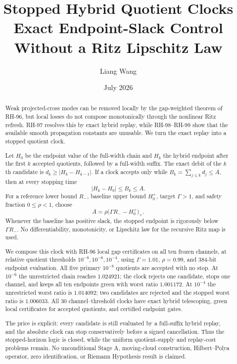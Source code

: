 \documentclass[11pt]{article}
\title{Stopped Hybrid Quotient Clocks\\
\large Exact Endpoint-Slack Control Without a Ritz Lipschitz Law}
\author{Liang Wang}
\date{July 2026}
\theoremstyle{definition}
\theoremstyle{remark}
\begin{document}
\maketitle

\begin{abstract}
Weak projected-cross modes can be removed locally by the gap-weighted theorem
of RH-96, but local losses do not compose monotonically through the nonlinear
Ritz refresh.  RH-97 resolves this by exact hybrid replay, while RH-98--RH-99
show that the available smooth propagation constants are unusable.  We turn
the exact replay into a stopped quotient clock.

Let $H_0$ be the endpoint value of the full-width chain and $H_k$ the hybrid
endpoint after the first $k$ accepted quotients, followed by a full-width
suffix.  The exact debit of the $k$th candidate is
$d_k\ge |H_k-H_{k-1}|$.  If a clock accepts only while
$B_k=\sum_{j\le k}d_j\le A$, then at every stopping time
\[
 |H_k-H_0|\le B_k\le A.
\]
For a reference lower bound $R_-$, baseline upper bound $H_0^+$, target
$\Gamma>1$, and safety fraction $0\le\rho<1$, choose
\[
 A=\rho\bigl(\Gamma R_--H_0^+\bigr)_+.
\]
Whenever the baseline has positive slack, the stopped endpoint is rigorously
below $\Gamma R_-$.  No differentiability, monotonicity, or Lipschitz law for
the recursive Ritz map is used.

We compose this clock with RH-96 local gap certificates on all ten frozen
channels, at relative quotient thresholds $10^{-8},10^{-6},10^{-4}$, using
$\Gamma=1.01$, $\rho=0.99$, and 384-bit endpoint evaluation.  All five primary
$10^{-8}$ quotients are accepted with no stop.  At $10^{-6}$ the unrestricted
chain reaches $1.024921$; the clock rejects one candidate, stops one channel,
and keeps all ten endpoints green with worst ratio $1.001172$.  At $10^{-4}$
the unrestricted worst ratio is $1.014092$; two candidates are rejected and
the stopped worst ratio is $1.006033$.  All 30 channel--threshold clocks have
exact hybrid telescoping, green local certificates for accepted quotients,
and certified endpoint gates.

The price is explicit: every candidate is still evaluated by a full-suffix
hybrid replay, and the absolute clock can stop conservatively before a signed
cancellation.  Thus the stopped-horizon logic is closed, while the uniform
quotient-supply and replay-cost problems remain.  No unconditional Stage A,
moving-cloud construction, Hilbert--Polya operator, zero identification, or
Riemann Hypothesis result is claimed.
\end{abstract}
\end{document}
